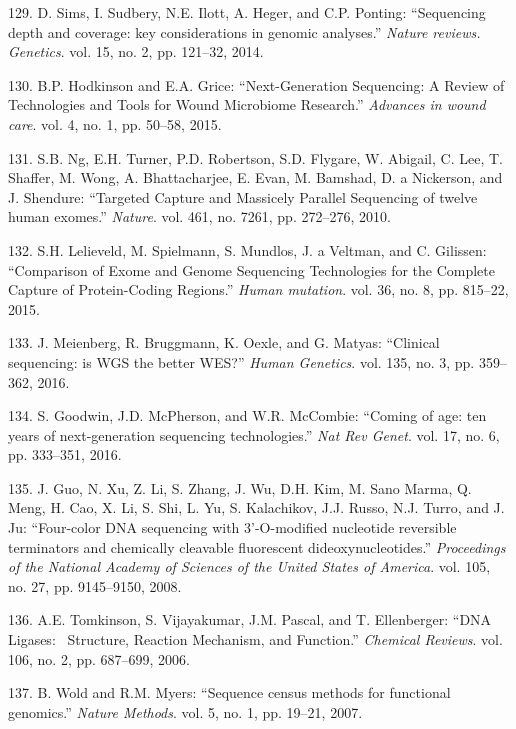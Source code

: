 \documentclass[12pt,a4paper,twoside]{ugathesis}
\theoremstyle{definition}
\theoremstyle{definition}
\theoremstyle{definition}
\theoremstyle{remark}
\begin{document}
\hypertarget{ref-Sims2014}{}
129. D. Sims, I. Sudbery, N.E. Ilott, A. Heger, and C.P. Ponting:
``Sequencing depth and coverage: key considerations in genomic
analyses.'' \emph{Nature reviews. Genetics}. vol. 15, no. 2, pp.
121--32, 2014.

\hypertarget{ref-Hodkinson2015}{}
130. B.P. Hodkinson and E.A. Grice: ``Next-Generation Sequencing: A
Review of Technologies and Tools for Wound Microbiome Research.''
\emph{Advances in wound care}. vol. 4, no. 1, pp. 50--58, 2015.

\hypertarget{ref-Ng2010}{}
131. S.B. Ng, E.H. Turner, P.D. Robertson, S.D. Flygare, W. Abigail, C.
Lee, T. Shaffer, M. Wong, A. Bhattacharjee, E. Evan, M. Bamshad, D. a
Nickerson, and J. Shendure: ``Targeted Capture and Massicely Parallel
Sequencing of twelve human exomes.'' \emph{Nature}. vol. 461, no. 7261,
pp. 272--276, 2010.

\hypertarget{ref-Lelieveld2015}{}
132. S.H. Lelieveld, M. Spielmann, S. Mundlos, J. a Veltman, and C.
Gilissen: ``Comparison of Exome and Genome Sequencing Technologies for
the Complete Capture of Protein-Coding Regions.'' \emph{Human mutation}.
vol. 36, no. 8, pp. 815--22, 2015.

\hypertarget{ref-Meienberg2016}{}
133. J. Meienberg, R. Bruggmann, K. Oexle, and G. Matyas: ``Clinical
sequencing: is WGS the better WES?'' \emph{Human Genetics}. vol. 135,
no. 3, pp. 359--362, 2016.

\hypertarget{ref-Goodwin2016}{}
134. S. Goodwin, J.D. McPherson, and W.R. McCombie: ``Coming of age: ten
years of next-generation sequencing technologies.'' \emph{Nat Rev
Genet}. vol. 17, no. 6, pp. 333--351, 2016.

\hypertarget{ref-Guo2008}{}
135. J. Guo, N. Xu, Z. Li, S. Zhang, J. Wu, D.H. Kim, M. Sano Marma, Q.
Meng, H. Cao, X. Li, S. Shi, L. Yu, S. Kalachikov, J.J. Russo, N.J.
Turro, and J. Ju: ``Four-color DNA sequencing with 3'-O-modified
nucleotide reversible terminators and chemically cleavable fluorescent
dideoxynucleotides.'' \emph{Proceedings of the National Academy of
Sciences of the United States of America}. vol. 105, no. 27, pp.
9145--9150, 2008.

\hypertarget{ref-Tomkinson2006}{}
136. A.E. Tomkinson, S. Vijayakumar, J.M. Pascal, and T. Ellenberger:
``DNA Ligases:~ Structure, Reaction Mechanism, and Function.''
\emph{Chemical Reviews}. vol. 106, no. 2, pp. 687--699, 2006.

\hypertarget{ref-Wold2007}{}
137. B. Wold and R.M. Myers: ``Sequence census methods for functional
genomics.'' \emph{Nature Methods}. vol. 5, no. 1, pp. 19--21, 2007.
\end{document}
